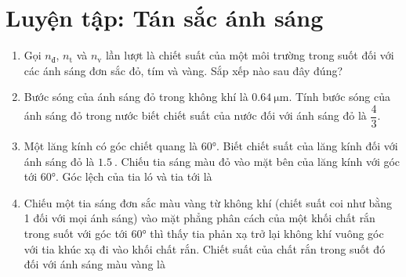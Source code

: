 \chapter{Luyện tập: Tán sắc ánh sáng}
\begin{enumerate}
	\item
	{
		Gọi $n_\text{đ}$, $n_\text{t}$ và $n_\text{v}$ lần lượt là chiết suất của một môi trường trong suốt đối với các ánh sáng đơn sắc đỏ, tím và vàng. Sắp xếp nào sau đây đúng?
	}
	\item
	{
		Bước sóng của ánh sáng đỏ trong không khí là $\SI{0.64}{\micro \meter}$. Tính bước sóng của ánh sáng đỏ trong nước biết chiết suất của nước đối với ánh sáng đỏ là $\dfrac{4}{3}$.
	}
	\item
	{
		Một lăng kính có góc chiết quang là $\ang{60}$. Biết chiết suất của lăng kính đối với ánh sáng đỏ là $\SI{1.5}{}$. Chiếu tia sáng màu đỏ vào mặt bên của lăng kính với góc tới $\ang{60}$. Góc lệch của tia ló và tia tới là
	}
	\item
	{
		Chiếu một tia sáng đơn sắc màu vàng từ không khí (chiết suất coi như bằng 1 đối với mọi ánh sáng) vào mặt phẳng phân cách của một khối chất rắn trong suốt với góc tới $\ang{60}$ thì thấy tia phản xạ trở lại không khí vuông góc với tia khúc xạ đi vào khối chất rắn. Chiết suất của chất rắn trong suốt đó đối với ánh sáng màu vàng là
}
\end{enumerate}
